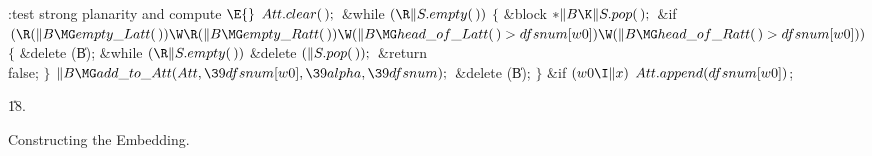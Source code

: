 \Y\B\4:test strong planarity and compute \X${}\E{}$\6
$\\{Att}.\\{clear}(\,);{}$\6
\&{while} ${}(\R\|S.\\{empty}(\,)){}$\5
${}\{{}$\1\6
\&{block} ${}{*}\|B\K\|S.\\{pop}(\,);{}$\7
\&{if} ${}(\R(\|B\MG\\{empty\_Latt}(\,))\W\R(\|B\MG\\{empty\_Ratt}(\,))\W(\|B%
\MG\\{head\_of\_Latt}(\,)>\\{dfsnum}[\\{w0}])\W(\|B\MG\\{head\_of\_Ratt}(\,)>%
\\{dfsnum}[\\{w0}])){}$\5
${}\{{}$\1\6
\&{delete} (\|B);\6
\&{while} ${}(\R\|S.\\{empty}(\,)){}$\1\5
\&{delete} ${}(\|S.\\{pop}(\,));{}$\2\6
\&{return} \\{false};\6
\4${}\}{}$\2\6
${}\|B\MG\\{add\_to\_Att}(\\{Att},\39\\{dfsnum}[\\{w0}],\39\\{alpha},\39%
\\{dfsnum});{}$\6
\&{delete} (\|B);\6
\4${}\}{}$\2\6
\&{if} ${}(\\{w0}\I\|x){}$\1\5
${}\\{Att}.\\{append}(\\{dfsnum}[\\{w0}]){}$;\2\par
\U18.\fi

Constructing the Embedding.    \label{embedding}




\newcommand{\bild}[2]{
\begin{figure}[htb]
\begin{center}

\end{center}
\caption{{#2}\label{#1}}
\end{figure}
}

